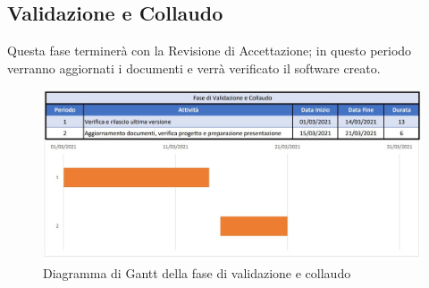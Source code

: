 \documentclass[../piano_di_progetto.tex]{subfiles}
\begin{document}
\subsection{Validazione e Collaudo}%
\label{sub:valid_coll}
Questa fase terminerà con la Revisione di Accettazione; in questo periodo verranno aggiornati i documenti e verrà verificato il software creato. 

\begin{figure}[H]
\centering
\includegraphics[width=12cm]{componenti/fase_valid_collaudo}
\caption{Diagramma di Gantt della fase di validazione e collaudo}
\end{figure}
\end{document}
